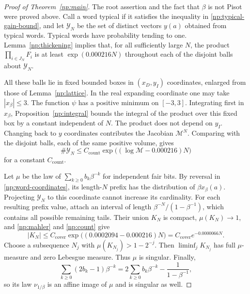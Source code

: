 \begin{proof}[Proof of Theorem~\ref{np:main}]
The root assertion and the fact that \(\beta\) is not Pisot were proved
above. Call a word typical if it satisfies the inequality in
\eqref{np:typical-gain-bound}, and let \(\mathcal Y_N\) be the set of
distinct vectors \(y(a)\) obtained from typical words. Typical words
have probability tending to one. Lemma~\ref{np:thickening} implies that,
for all sufficiently large \(N\), the product \(\prod_{i\in J_N}F_i\)
is at least \(\exp(0.000216N)\) throughout each of the disjoint balls
about \(\mathcal Y_N\).

All these balls lie in fixed bounded boxes in \((x_D,y_I)\)
coordinates, enlarged from those of Lemma~\ref{np:lattice}. In the
real expanding coordinate one may take \(|x_\beta|\le3\).
The function \(\psi\) has a positive minimum on \([-3,3]\).
Integrating first in \(x_\beta\), Proposition~\ref{np:integral} bounds
the integral of the product over this fixed box by a constant
independent of \(N\). The product does not depend on \(y_I\).
Changing back to \(y\) coordinates contributes the Jacobian
\(\mathcal M^N\). Comparing with the disjoint balls, each of the same
positive volume, gives
\begin{equation}
 \#\mathcal Y_N\le C_{\mathrm{count}}
       \exp\bigl((\log\mathcal M-0.000216)N\bigr)
 \label{np:count}
\end{equation}
for a constant \(C_{\mathrm{count}}\).

Let \(\mu\) be the law of \(\sum_{k\ge0}b_k\beta^{-k}\) for independent
fair bits. By reversal in \eqref{np:word-coordinates}, its length-\(N\)
prefix has the distribution of \(\beta x_\beta(a)\). Projecting
\(\mathcal Y_N\) to this coordinate cannot increase its cardinality.
For each resulting prefix value, attach an interval of length
\(\beta^{-N}/(1-\beta^{-1})\), which contains all possible remaining
tails. Their union \(K_N\) is compact, \(\mu(K_N)\to1\), and
\eqref{np:mahler} and \eqref{np:count} give
\begin{equation}
 |K_N|\le C_{\mathrm{cover}}\exp\bigl((0.0002094-0.000216)N\bigr)
       =C_{\mathrm{cover}}e^{-0.0000066N}.
 \label{np:cover-bound}
\end{equation}
Choose a subsequence \(N_j\) with \(\mu(K_{N_j})>1-2^{-j}\).
Then \(\liminf_jK_{N_j}\) has full \(\mu\)-measure and zero Lebesgue
measure. Thus \(\mu\) is singular. Finally,
\[
 \sum_{k\ge0}(2b_k-1)\beta^{-k}
 =2\sum_{k\ge0}b_k\beta^{-k}-\frac1{1-\beta^{-1}},
\]
so its law \(\nu_{1/\beta}\) is an affine image of \(\mu\) and is
singular as well.
\end{proof}
